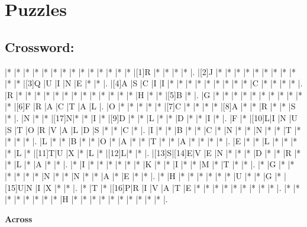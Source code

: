 \documentclass{article}
\begin{document}
\section*{Puzzles}

\subsection*{Crossword:}

\begin{Puzzle}{19}{17} %
|*    |*    |*    |*    |*    |*    |*    |*    |*    |*    |*    |*    |*    |*    |[1]R |*    |*    |*    |*    |.
|[2]J |*    |*    |*    |*    |*    |*    |*    |*    |*    |*    |*    |[3]Q |U    |I    |N    |E    |*    |*    |.
|[4]A |S    |C    |I    |I    |*    |*    |*    |*    |*    |*    |*    |*    |*    |C    |*    |*    |*    |*    |.
|R    |*    |*    |*    |*    |*    |*    |*    |*    |*    |*    |*    |*    |*    |H    |*    |*    |[5]B |*    |.
|G    |*    |*    |*    |*    |*    |*    |*    |*    |*    |*    |*    |[6]F |R    |A    |C    |T    |A    |L    |.
|O    |*    |*    |*    |*    |*    |[7]C |*    |*    |*    |*    |[8]A |*    |*    |R    |*    |*    |S    |*    |.
|N    |*    |*    |[17]N|*    |*    |I    |*    |[9]D |*    |*    |L    |*    |*    |D    |*    |*    |I    |*    |.
|F    |*    |[10]L|I    |N    |U    |S    |T    |O    |R    |V    |A    |L    |D    |S    |*    |*    |C    |*    |.
|I    |*    |*    |B    |*    |*    |C    |*    |N    |*    |*    |N    |*    |*    |T    |*    |*    |*    |*    |.
|L    |*    |*    |B    |*    |*    |O    |*    |A    |*    |*    |T    |*    |*    |A    |*    |*    |*    |*    |.
|E    |*    |*    |L    |*    |*    |*    |*    |L    |*    |[11]T|U    |X    |*    |L    |*    |[12]L|*    |*    |.
|[13]S|[14]E|V    |E    |N    |*    |*    |*    |D    |*    |*    |R    |*    |*    |L    |*    |A    |*    |*    |.
|*    |I    |*    |*    |*    |*    |*    |*    |K    |*    |*    |I    |*    |*    |M    |*    |T    |*    |*    |.
|*    |G    |*    |*    |*    |*    |*    |*    |N    |*    |*    |N    |*    |*    |A    |*    |E    |*    |*    |.
|*    |H    |*    |*    |*    |*    |*    |*    |U    |*    |*    |G    |*    |[15]U|N    |I    |X    |*    |*    |.
|*    |T    |*    |[16]P|R    |I    |V    |A    |T    |E    |*    |*    |*    |*    |*    |*    |*    |*    |*    |.
|*    |*    |*    |*    |*    |*    |*    |*    |H    |*    |*    |*    |*    |*    |*    |*    |*    |*    |*    |.
\end{Puzzle}


\begin{PuzzleClues}{\textbf{Across}} %
\end{PuzzleClues} %
\end{document}
